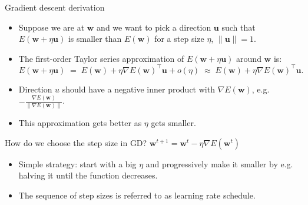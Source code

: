 \documentclass[handout,aspectratio=169]{beamer}
\begin{document}
\begin{frame}{Gradient descent derivation}
	\begin{itemize}
		\item Suppose we are at $\mathbf w$ and we want to pick a direction $\mathbf u$ such that $E(\mathbf w+\eta \mathbf u)$ is smaller than $E(\mathbf w)$ for a step size $\eta$, $\|\mathbf u\|=1$.
		\item The first-order Taylor series approximation of $E(\mathbf w+\eta \mathbf u)$ around $\mathbf w$ is: $$E(\mathbf w+\eta \mathbf u)\;=\;E(\mathbf w)+\eta\nabla E(\mathbf w)^\top \mathbf u +o(\eta)\;\approx\; E(\mathbf w)+\eta\nabla E(\mathbf w)^\top \mathbf u.$$
		\item Direction $u$ should have a negative inner product with $\nabla E(\mathbf w)$, e.g. $-\tfrac{\nabla E(\mathbf w)}{\|\nabla E(\mathbf w)\|}$. 
		\item This approximation gets better as $\eta$ gets smaller. 
	\end{itemize}
	\begin{exampleblock}{How do we choose the step size in GD? \;\;\;\;\;\;\;$\mathbf w^{t+1}=\mathbf w^t-\eta\nabla E(\mathbf w^t)$}
	\begin{itemize}
		\item Simple strategy: start with a big $\eta$ and progressively make it smaller by e.g. halving it until the function decreases.
		\item The sequence of step sizes is referred to as \alert{learning rate schedule}. 
	\end{itemize}
	\end{exampleblock}
\end{frame}

\end{document}
